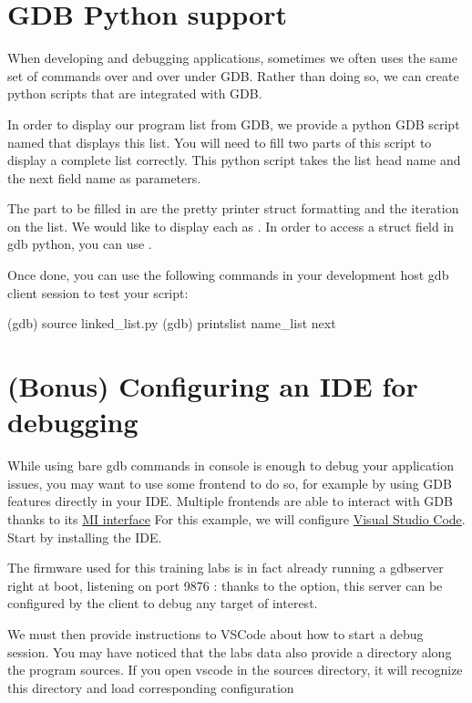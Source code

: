 \section{GDB Python support}

When developing and debugging applications, sometimes we often uses the same
set of commands over and over under GDB. Rather than doing so, we can create
python scripts that are integrated with GDB.

In order to display our program list from GDB, we provide a python GDB script
named  that displays this list. You will need to fill two
parts of this script to display a complete list correctly. This python script
takes the list head name and the next field name as parameters.

The part to be filled in are the pretty printer struct formatting and the
iteration on the list. We would like to display each  as
. In order to access a struct field in gdb python, you can use
.

Once done, you can use the following commands in your development host gdb
client session to test your script:

\begin{bashinput}
(gdb) source linked_list.py
(gdb) printslist name_list next
\end{bashinput}

\section{(Bonus) Configuring an IDE for debugging}

While using bare gdb commands in console is enough to debug your application issues, you
may want to use some frontend to do so, for example by using GDB features directly
in your IDE. Multiple frontends are able to interact with GDB thanks to its
\href{https://sourceware.org/gdb/current/onlinedocs/gdb.html/GDB_002fMI.html}{MI
interface}
For this example, we will configure
\href{https://code.visualstudio.com/}{Visual Studio Code}. Start by installing
the IDE.

The firmware used for this training labs is in fact already running a gdbserver
right at boot, listening on port 9876 : thanks to the  option,
this server can be configured by the client to debug any target of interest.

We must then provide instructions to VSCode about how to start a debug session.
You may have noticed that the labs data also provide a  directory
along the program sources. If you open vscode in the sources directory, it will
recognize this  directory and load corresponding configuration

